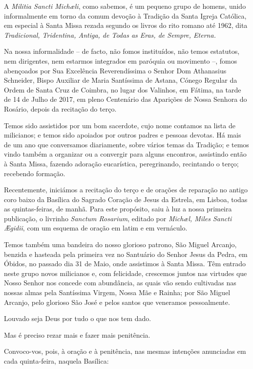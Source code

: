 \documentclass[paper=a5,10pt,openany]{scrbook}
\begin{document}
A \textit{Militia Sancti Michæli}, como sabemos, é um pequeno grupo de homens, unido informalmente em torno da comum devoção à Tradição da Santa Igreja Católica, em especial à Santa Missa rezada segundo os livros do rito romano até 1962, dita \textit{Tradicional, Tridentina, Antiga, de Todas as Eras, de Sempre, Eterna.}

Na nossa informalidade – de facto, não fomos instituídos, não temos estatutos, nem dirigentes, nem estarmos integrados em paróquia ou movimento –, fomos abençoados por Sua Excelência Reverendíssima o Senhor Dom Athanasius Schneider, Bispo Auxiliar de Maria Santíssima de Astana, Cónego Regular da Ordem de Santa Cruz de Coimbra, no lugar dos Valinhos, em Fátima, na tarde de 14 de Julho de 2017, em pleno Centenário das Aparições de Nossa Senhora do Rosário, depois da recitação do terço. 

Temos sido assistidos por um bom sacerdote, cujo nome contamos na lista de milicianos; e temos sido apoiados por outros padres e pessoas devotas.  
Há mais de um ano que conversamos diariamente, sobre vários temas da Tradição; e temos vindo também a organizar ou a convergir para alguns encontros, assistindo então à Santa Missa, fazendo adoração eucarística, peregrinando, recintando o terço; recebendo formação. 

Recentemente, iniciámos a recitação do terço e de orações de reparação no antigo coro baixo da Basílica do Sagrado Coração de Jesus da Estrela, em Lisboa, todas as quintas-feiras, de manhã. Para este propósito, saiu à luz a nossa primeira publicação, o livrinho \textit{Sanctum Rosarium}, editado por \textit{Michæl, Miles Sancti Ægidii}, com um esquema de oração em latim e em vernáculo. 

Temos também uma bandeira do nosso glorioso patrono, São Miguel Arcanjo, benzida e hasteada pela primeira vez no Santuário do Senhor Jesus da Pedra, em Óbidos, no passado dia 31 de Maio, onde assistimos à Santa Missa. 
Têm entrado neste grupo novos milicianos e, com felicidade, crescemos juntos nas virtudes que Nosso Senhor nos concede com abundância, as quais vão sendo cultivadas nas nossas almas pela Santíssima Virgem, Nossa Mãe e Rainha; por São Miguel Arcanjo, pelo glorioso São José e pelos santos que veneramos pessoalmente. 

Louvado seja Deus por tudo o que nos tem dado.

Mas é preciso rezar mais e fazer mais penitência. 

Convoco-vos, pois, à oração e à penitência, nas mesmas intenções anunciadas em cada quinta-feira, naquela Basílica:
\end{document}
